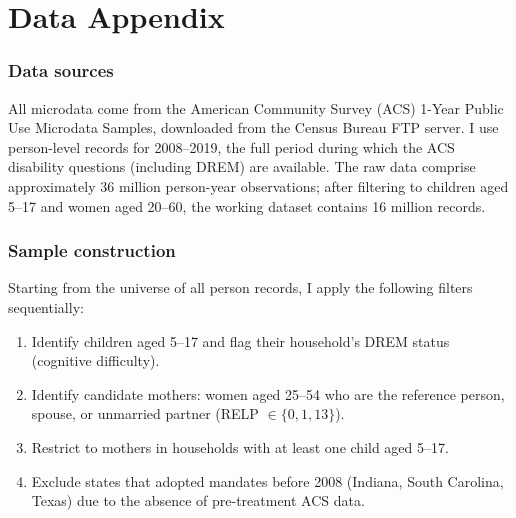 \documentclass[12pt]{article}
\begin{document}
\label{apep_main_text_end}
\newpage


\newpage
\appendix

\section{Data Appendix}

\subsubsection*{Data sources}  All microdata come from the American Community Survey (ACS) 1-Year Public Use Microdata Samples, downloaded from the Census Bureau FTP server. I use person-level records for 2008--2019, the full period during which the ACS disability questions (including DREM) are available. The raw data comprise approximately 36 million person-year observations; after filtering to children aged 5--17 and women aged 20--60, the working dataset contains 16 million records.

\subsubsection*{Sample construction}  Starting from the universe of all person records, I apply the following filters sequentially:
\begin{enumerate}
\item Identify children aged 5--17 and flag their household's DREM status (cognitive difficulty).
\item Identify candidate mothers: women aged 25--54 who are the reference person, spouse, or unmarried partner (RELP $\in \{0, 1, 13\}$).
\item Restrict to mothers in households with at least one child aged 5--17.
\item Exclude states that adopted mandates before 2008 (Indiana, South Carolina, Texas) due to the absence of pre-treatment ACS data.
\end{enumerate}
\end{document}
